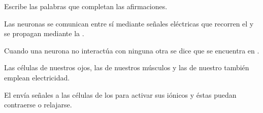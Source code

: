 Escribe las palabras que completan las afirmaciones.
\begin{parts}
    Las neuronas se comunican entre sí mediante señales eléctricas que recorren el \fillin[axón][1cm]
    y se propagan mediante la \fillin[sinapsis][2cm].

    Cuando una neurona no interactúa con ninguna otra se dice que se encuentra en \fillin[reposo][2cm].

    Las células de nuestros ojos, las de nuestros músculos y las de nuestro \fillin[corazón][2cm]
    también emplean electricidad.

    El \fillin[cerebro][2cm] envía señales a las células de los \fillin[músculos][2cm]
    para activar sus \fillin[canales][2cm] iónicos y éstas puedan contraerse o relajarse.
\end{parts}